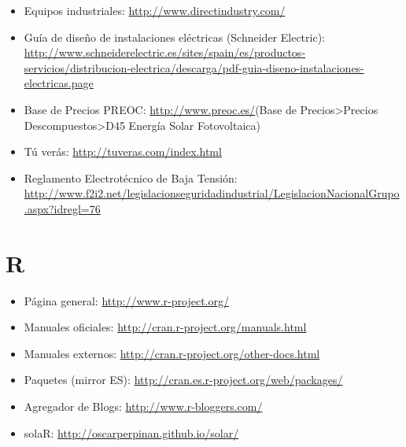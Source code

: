 \begin{itemize}
\item Equipos industriales: \url{http://www.directindustry.com/}
\item Guía de diseño de instalaciones eléctricas (Schneider Electric):
  \url{http://www.schneiderelectric.es/sites/spain/es/productos-servicios/distribucion-electrica/descarga/pdf-guia-diseno-instalaciones-electricas.page}
\item Base de Precios PREOC: \url{http://www.preoc.es/}(Base de
  Precios>Precios Descompuestos>D45 Energía Solar Fotovoltaica)
\item Tú verás: \url{http://tuveras.com/index.html}
\item Reglamento Electrotécnico de Baja Tensión:
  \url{http://www.f2i2.net/legislacionseguridadindustrial/LegislacionNacionalGrupo.aspx?idregl=76}
\end{itemize}

\section{R}
\label{sec:R}

\begin{itemize}
\item Página general: \url{http://www.r-project.org/}
\item Manuales oficiales: \url{http://cran.r-project.org/manuals.html}
\item Manuales externos:
  \url{http://cran.r-project.org/other-docs.html}
\item Paquetes (mirror ES):
  \url{http://cran.es.r-project.org/web/packages/}
\item Agregador de Blogs: \url{http://www.r-bloggers.com/}
\item solaR: \url{http://oscarperpinan.github.io/solar/}

\end{itemize}